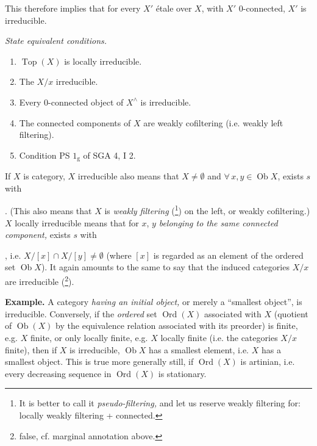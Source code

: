 This therefore implies that for every $X'$ étale over $X$, with $X'$ 0-connected, $X'$ is irreducible.

\textit{State equivalent conditions.}
\begin{enumerate}
\item[a)] $\operatorname{Top}(X)$ is locally irreducible.
\item[b)] The $X/x$ irreducible.
\item[c)] Every 0-connected object of $X^\wedge$ is irreducible.
\item[d)] The connected components of $X$ are weakly cofiltering (i.e. weakly left filtering).
\item[e)] Condition PS $1_{\mathrm{g}}$ of SGA 4, I 2.
\end{enumerate}
If $X$ is category, $X$ irreducible also means that $X \neq \emptyset$ and $\forall\, x, y \in \operatorname{Ob} X$, exists $s$ with . (This also means that $X$ is \textit{weakly filtering} (\footnote[11]{It is better to call it \textit{pseudo-filtering,} and let us reserve weakly filtering for: locally weakly filtering + connected.}) on the left, or weakly cofiltering.) $X$ locally irreducible means that for $x$, $y$ \textit{belonging to the same connected component,} exists $s$ with , %
i.e. $X/[x] \cap X/[y] \neq \emptyset$ (where $[x]$ is regarded as an element of the ordered set $\operatorname{Ob} X$). It again amounts to the same to say that the induced categories $X/x$ are irreducible (\footnote[12]{false, cf. marginal annotation above.}).

\textbf{Example.} A category \textit{having an initial object,} or merely a ``smallest object'', is irreducible. Conversely, if the \textit{ordered} set $\operatorname{Ord}(X)$ associated with $X$ (quotient of $\operatorname{Ob}(X)$ by the equivalence relation associated with its preorder) is finite, e.g. $X$ finite, or only locally finite, e.g. $X$ locally finite (i.e. the categories $X/x$ finite), then if $X$ is irreducible, $\operatorname{Ob} X$ has a smallest element, i.e. $X$ has a smallest object. This is true more generally still, if $\operatorname{Ord}(X)$ is artinian, i.e. every decreasing sequence in $\operatorname{Ord}(X)$ is stationary. %

